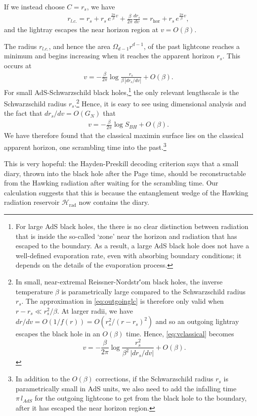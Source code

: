\documentclass[11pt,a4paper]{article}
\begin{document}
If we instead choose $C=r_s$, we have
\begin{align} \label{eq:outgoinglc}
r_{l.c.} = r_s + r_s \,e^{\frac{2\pi}{\beta}v} + \frac{\beta}{2 \pi} \frac{d r_s}{d v} = r_\text{hor} + r_s\,e^{\frac{2\pi}{\beta}v},
\end{align}
and the lightray escapes the near horizon region at $v = O(\beta)$.

The radius $r_{l.c.}$, and hence the area $\Omega_{d-1}r^{d-1}$, of the past lightcone reaches a minimum and begins increasing when it reaches the apparent horizon $r_s$. This occurs at
\begin{align} \label{eq:vclassical}
v = - \frac{\beta}{2\pi} \log \frac{r_s}{\beta\, |d r_s/d v|} + O(\beta).
\end{align}
For small AdS-Schwarzschild black holes,\footnote{For large AdS black holes, the there is no clear distinction between radiation that is inside the so-called `zone' near the horizon and radiation that has escaped to the boundary. As a result, a large AdS black hole does not have a well-defined evaporation rate, even with absorbing boundary conditions; it depends on the details of the evaporation process.} the only relevant lengthscale is the Schwarzschild radius $r_s$.\footnote{\label{foot:nearextremal} In small, near-extremal Reissner-Nordstr\''{o}m black holes, the inverse temperature $\beta$ is parametrically large compared to the Schwarzschild radius $r_s$. The approximation in \eqref{eq:outgoinglc} is therefore only valid when $r - r_s \ll r_s^2 / \beta$. At larger radii, we have $dr/dv = O(1/f(r)) = O(r_s^2/(r - r_s)^2)$ and so an outgoing lightray escapes the black hole in an $O(\beta)$ time. Hence, \eqref{eq:vclassical} becomes $$v = - \frac{\beta}{2\pi} \log \frac{r_s^2}{\beta^2\, |d r_s/d v|} + O(\beta).$$} Hence, it is easy to see using dimensional analysis and the fact that $d r_s/d v = O(G_N)$ that
\begin{align}
v = - \frac{\beta}{2 \pi} \log S_{BH} + O(\beta).
\end{align}
We have therefore found that the classical maximin surface lies on the classical apparent horizon, one scrambling time into the past.\footnote{In addition to the $O(\beta)$ corrections, if the Schwarzschild radius $r_s$ is parametrically small in AdS units, we also need to add the infalling time $\pi\, l_{AdS}$ for the outgoing lightcone to get from the black hole to the boundary, after it has escaped the near horizon region.} 

This is very hopeful: the Hayden-Preskill decoding criterion says that a small diary, thrown into the black hole after the Page time, should be reconstructable from the Hawking radiation after waiting for the scrambling time. Our calculation suggests that this is because the entanglement wedge of the Hawking radiation reservoir $\mathcal{H}_\text{rad}$ now contains the diary.
\end{document}
